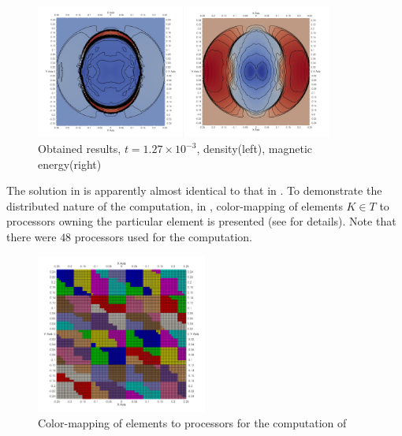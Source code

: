 \begin{figure}[H]
	\begin{center}
		\includegraphics[width=0.87\textwidth]{img//mhd-blast/old/my3.jpg}
	\caption{Obtained results, $t = 1.27\times 10^{-3}$, density(left), magnetic energy(right)}
	\label{figure:blastOldMy4}
	\end{center}
\end{figure}
\vspace{-5mm}
The solution in  is apparently almost identical to that in . To demonstrate the distributed nature of the computation, in , color-mapping of elements $K \in T$ to processors owning the particular element is presented (see  for details). Note that there were $48$ processors used for the computation.

\begin{figure}[H]
	\begin{center}
		\includegraphics[width=0.5\textwidth]{img//mhd-blast/old/subdomain.jpg}
	\caption{Color-mapping of elements to processors for the computation of }
	\label{figure:subdomainsBlastOld}
	\end{center}
\end{figure}
\vspace{-5mm}

